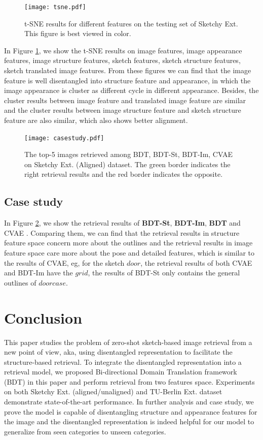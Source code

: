 \documentclass[10pt,twocolumn,letterpaper]{article}
\begin{document}
\begin{figure}
\begin{center}
\texttt{[image: tsne.pdf]}
\end{center}
   \caption{t-SNE results for different features on the testing set of Sketchy Ext. This figure is best viewed in color.}
\label{fig:tsne}
\end{figure}

In Figure \ref{fig:tsne}, we show the t-SNE results on image features, image appearance features, image structure features, sketch features, sketch structure features, sketch translated image features. From these figures we can find that the image feature is well disentangled into structure feature and appearance, \color{red}in which the image appearance is cluster as different cycle in different appearance.\color{black} Besides, the cluster results between image feature and translated image feature are similar and the cluster results between image structure feature and sketch structure feature are also similar, which also shows better alignment.

\begin{figure}
\begin{center}
\texttt{[image: casestudy.pdf]}
\end{center}
   \caption{The top-5 images retrieved among BDT, BDT-St, BDT-Im, CVAE on Sketchy Ext. (Aligned) dataset. The green border indicates the right retrieval results and the red border indicates the opposite.}
\label{fig:case}
\end{figure}

\subsection{Case study}
In Figure \ref{fig:case}, we show the retrieval results of \textbf{BDT-St}, \textbf{BDT-Im}, \textbf{BDT} and CVAE \cite{yelamarthi2018zero}. Comparing them, we can find that the retrieval results in structure feature space concern more about the outlines and the retrieval results in image feature space care more about the pose and detailed features, which is similar to the results of CVAE, eg, for the sketch $door$, the retrieval results of both CVAE and BDT-Im have the $grid$, the results of BDT-St only contains the general outlines of $doorcase$.

\section{Conclusion}
This paper studies the problem of zero-shot sketch-based image retrieval from a new point of view, aka, using disentangled representation to facilitate the structure-based retrieval. To integrate the disentangled representation into a retrieval model, we proposed Bi-directional Domain Translation framework (BDT) in this paper and perform retrieval from two features space. Experiments on both Sketchy Ext. (aligned/unaligned) and TU-Berlin Ext. dataset demonstrate state-of-the-art performance. In further analysis and case study, we prove the model is capable of disentangling structure and appearance features for the image and the disentangled representation is indeed helpful for our model to generalize from seen categories to unseen categories.


{\small


}
\end{document}
